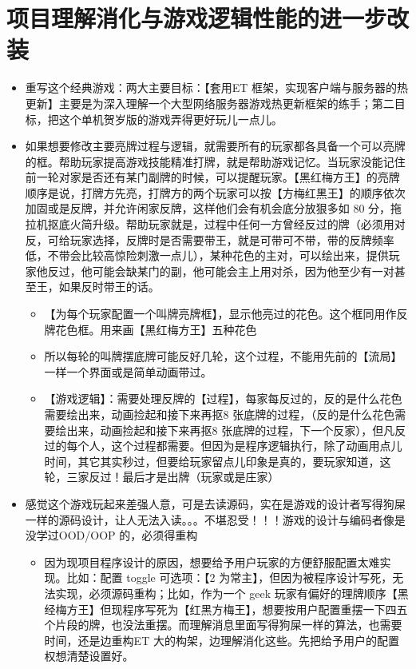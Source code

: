 \documentclass[9pt, b5paper]{article}
\begin{document}
\section{项目理解消化与游戏逻辑性能的进一步改装}
\label{sec-5}
\begin{itemize}
\item 重写这个经典游戏：两大主要目标：【套用ET 框架，实现客户端与服务器的热更新】主要是为深入理解一个大型网络服务器游戏热更新框架的练手；第二目标，把这个单机贺岁版的游戏弄得更好玩儿一点儿。
\item 如果想要修改主要亮牌过程与逻辑，就需要所有的玩家都各具备一个可以亮牌的框。帮助玩家提高游戏技能精准打牌，就是帮助游戏记忆。当玩家没能记住前一轮对家是否还有某门副牌的时候，可以提醒玩家。【黑红梅方王】的亮牌顺序是说，打牌方先亮，打牌方的两个玩家可以按【方梅红黑王】的顺序依次加固或是反牌，并允许闲家反牌，这样他们会有机会底分放狠多如 80 分，拖拉机抠底火简升级。帮助玩家就是，过程中任何一方曾经反过的牌（必须用对反，可给玩家选择，反牌时是否需要带王，就是可带可不带，带的反牌频率低，不带会比较高惊险刺激一点儿），某种花色的主对，可以绘出来，提供玩家他反过，他可能会缺某门的副，他可能会主上用对杀，因为他至少有一对甚至王，如果反时带王的话。
\begin{itemize}
\item 【为每个玩家配置一个叫牌亮牌框】，显示他亮过的花色。这个框同用作反牌花色框。用来画【黑红梅方王】五种花色
\item 所以每轮的叫牌摆底牌可能反好几轮，这个过程，不能用先前的【流局】一样一个界面或是简单动画带过。
\item 【游戏逻辑】：需要处理反牌的【过程】，每家每反过的，反的是什么花色需要绘出来，动画捡起和接下来再抠8 张底牌的过程，（反的是什么花色需要绘出来，动画捡起和接下来再抠8 张底牌的过程，下一个反家），但凡反过的每个人，这个过程都需要。但因为是程序逻辑执行，除了动画用点儿时间，其它其实秒过，但要给玩家留点儿印象是真的，要玩家知道，这轮，三家反过！最后才是出牌（玩家或是庄家）
\end{itemize}
\item 感觉这个游戏玩起来差强人意，可是去读源码，实在是游戏的设计者写得狗屎一样的源码设计，让人无法入读。。。不堪忍受！！！游戏的设计与编码者像是没学过OOD/OOP 的，必须得重构
\begin{itemize}
\item 因为现项目程序设计的原因，想要给予用户玩家的方便舒服配置太难实现。比如：配置 toggle 可选项：【2 为常主】，但因为被程序设计写死，无法实现，必须源码重构；比如，作为一个 geek 玩家有偏好的理牌顺序【黑经梅方王】但现程序写死为【红黑方梅王】，想要按用户配置重摆一下四五个片段的牌，也没法重摆。而理解消息里面写得狗屎一样的算法，也需要时间，还是边重构ET 大的构架，边理解消化这些。先把给予用户的配置权想清楚设置好。

\end{itemize}
\end{itemize}
\end{document}
